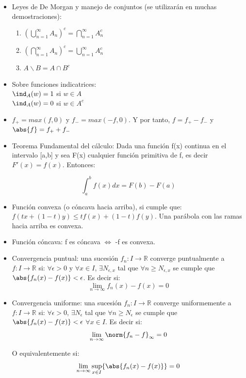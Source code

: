 \documentclass{apuntes}
\begin{document}
\begin{itemize}
\item Leyes de De Morgan y manejo de conjuntos (se utilizarán en muchas demostraciones):
\begin{enumerate}
\item $(\bigcup_{n=1}^{\infty}A_n)^c = \bigcap_{n=1}^{\infty}A_n^c$
\item $(\bigcap_{n=1}^{\infty}A_n)^c = \bigcup_{n=1}^{\infty}A_n^c$
\item $A \backslash B = A \cap B^c$

\end{enumerate}
\item Sobre funciones indicatrices:\\
$\ind_A(w)=1$ si $w \in A$\\
$\ind_A(w)=0$ si $w \in A^c$

\item $f_+ = max(f,0)$ y $f_- = max(-f,0)$. Y por tanto, $f=f_+ -f_-$ y $\abs{f}=f_+ +f_-$

\item Teorema Fundamental del cálculo: Dada una función f(x) continua en el intervalo [a,b] y sea F(x) cualquier función primitiva de f, es decir $F '(x) = f(x)$. Entonces:

\[
\int_a^b f(x)dx = F(b)-F(a)
\]
\item Función convexa (o cóncava hacia arriba), si cumple que: $f(tx+(1-t)y) \leq tf(x)+(1-t)f(y)$. Una parábola con las ramas hacia arriba es convexa.
\item Función cóncava: f es cóncava $\Leftrightarrow$ -f es convexa.
\item Convergencia puntual: una sucesión $f_n:I\rightarrow \mathbb{R}$ converge puntualmente a $f:I\rightarrow \mathbb{R}$ si: $\forall \epsilon >0$ y $\forall x \in I$, $\exists N_{\epsilon, x}$ tal que $\forall n \geq N_{\epsilon, x}$ se cumple que $\abs{f_n(x)-f(x)}<\epsilon$. Es decir si:
\[
\lim_{n \rightarrow \infty} f_n(x)-f(x)=0
\]

\item Convergencia uniforme: una sucesión $f_n:I\rightarrow \mathbb{R}$ converge uniformemente a $f:I\rightarrow \mathbb{R}$ si: $\forall \epsilon >0$,  $\exists N_{\epsilon}$ tal que $\forall n \geq N_{\epsilon}$ se cumple que $\abs{f_n(x)-f(x)}<\epsilon$ $\forall x \in I$. Es decir si:
\[
\lim_{n \rightarrow \infty} \norm{f_n - f}_{\infty} = 0
\]

O equivalentemente si:
\[
\lim_{n \rightarrow \infty} \sup_{x \in I}\{\abs{f_n(x)-f(x)} \}=0
\]


\end{itemize}
\end{document}
